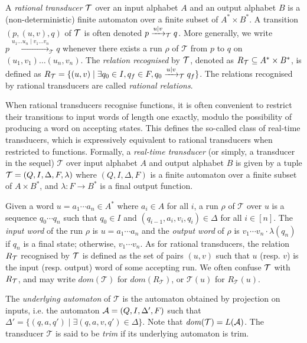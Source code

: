 \documentclass[a4paper,UKenglish,cleveref, autoref, thm-restate,authorcolumns, colorlinks]{lipics-v2021}
\newcommand\dom{\mathit{dom}}
\newcommand\calT{\mathcal{T}}
\begin{document}
A \emph{rational transducer} $\cal T$ over an input alphabet $A$ and an output alphabet $B$ is a (non-deterministic) finite automaton over a finite subset of $A^*\times B^*$. A transition $(p,(u,v),q)$ of $\cal T$ is often denoted $p\xrightarrow{u\mid v}_{\cal T} q$. More generally, we write $p\xrightarrow{u_1\dots u_n\mid v_1\dots v_n}_{\calT} q$ whenever there exists a run $\rho$ of $\calT$ from $p$ to $q$ on $(u_1,v_1)\dots (u_n,v_n)$. The \emph{relation recognised} by $\cal T$, denoted as $R_{\cal T}\subseteq A^*\times B^*$, is defined as 
$R_{\cal T} = \{ (u,v)\mid\exists q_0\in I,q_f\in F,q_0\xrightarrow{u\mid v}_{\calT} q_f\}$. The relations recognised by rational transducers are called \emph{rational relations}. 


When rational transducers recognise functions, it is often convenient to restrict their transitions to input words of length one exactly, modulo the possibility of producing a word on accepting states. This defines the so-called class of real-time transducers, which is expressively equivalent to rational transducers when restricted to functions. 
Formally, a \emph{real-time transducer} (or simply, a transducer in the sequel) $\calT$ over input alphabet $A$ and output alphabet $B$ is given by a tuple ${\cal T} = (Q, I,\Delta, F, \lambda)$ where 
$(Q,I,\Delta, F)$ is a finite automaton over a finite subset of $A\times B^*$, and $\lambda : F\rightarrow B^*$ is a final output function. 


Given a word $u = a_1 \cdots a_n \in A^*$ where $a_i\in A$ for all $i$, a run $\rho$ of $\calT$ over $u$ is a sequence $q_0 \cdots q_n$ such that $q_0 \in I$ and $(q_{i-1},a_i,v_i,q_i) \in \Delta$ for all $i \in [n]$. The \emph{input word} of the run $\rho$ is $u = a_1 \cdots a_n$ and the \emph{output word} of $\rho$ is $v_1 \cdots v_n \cdot \lambda(q_n)$ if $q_n$ is a final state; otherwise, $v_1 \cdots v_n$. As for rational transducers, the relation $R_{\cal T}$ recognised by $\cal T$ is defined as the set of pairs $(u,v)$ such that $u$ (resp. $v$) is the input (resp. output) word of some accepting run. We often confuse $\cal T$ with $R_{\cal T}$, and may write $\dom(\calT)$ for $\dom(R_\calT)$, or $\calT(u)$ for $R_\calT(u)$. 



 The \emph{underlying automaton} of $\calT$ is the automaton obtained by projection on inputs, i.e. the automaton ${\cal A} = (Q, I, \Delta', F)$ such that $\Delta' = \{(q,a,q')\mid \exists (q,a,v,q')\in\Delta\}$. Note that $\dom(\calT) = L({\cal A})$. The transducer $\calT$ is said to be \emph{trim} if its underlying automaton is trim.
\end{document}
